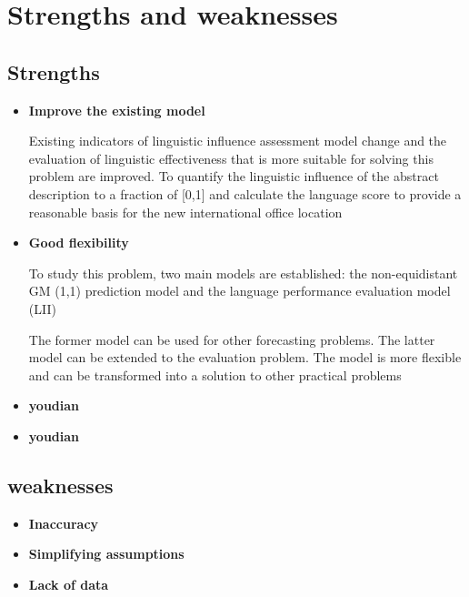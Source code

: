 \section{Strengths and weaknesses}
\subsection{Strengths}
\begin{itemize}
	\item \textbf{Improve the existing model}
	\par Existing indicators of linguistic influence assessment model change and the evaluation of linguistic effectiveness that is more suitable for solving this problem are improved. To quantify the linguistic influence of the abstract description to a fraction of [0,1] and calculate the language score to provide a reasonable basis for the new international office location
	\item \textbf{Good flexibility}
	\par To study this problem, two main models are established: the non-equidistant GM (1,1) prediction model and the language performance evaluation model (LII)
	\par The former model can be used for other forecasting problems. The latter model can be extended to the evaluation problem. The model is more flexible and can be transformed into a solution to other practical problems
	\item \textbf{youdian}
	
	\item \textbf{youdian}
	
\end{itemize}

\subsection{weaknesses}

\begin{itemize}
	\item \textbf{Inaccuracy}
	\item \textbf{Simplifying assumptions}
	\item \textbf{Lack of data}
\end{itemize}